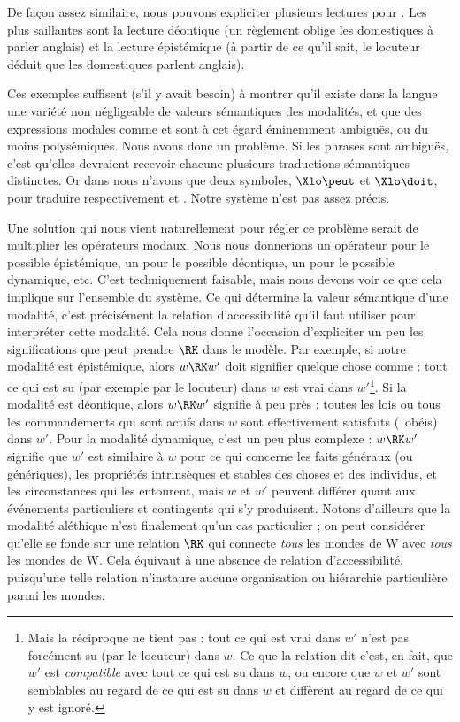 De façon assez similaire, nous pouvons expliciter plusieurs lectures pour \Last[b]. Les plus saillantes sont la lecture déontique (un règlement oblige les domestiques à parler anglais) et la lecture épistémique (à partir de ce qu'il sait, le locuteur déduit que les domestiques parlent anglais).

Ces exemples suffisent (s'il y avait besoin) à montrer qu'il existe dans la langue une variété non négligeable de valeurs sémantiques des modalités, et que des expressions modales comme  et  sont à cet égard éminemment ambiguës, ou du moins polysémiques.
Nous avons donc un problème. Si les phrases {\Last} sont ambiguës, c'est qu'elles devraient recevoir chacune plusieurs  traductions sémantiques distinctes. 
Or dans {\LO} nous n'avons que deux symboles, $\Xlo\peut$ et $\Xlo\doit$, pour traduire respectivement   et . 
Notre système n'est pas assez précis.

Une solution qui nous vient naturellement pour régler ce problème serait de multiplier les opérateurs modaux. Nous nous donnerions un opérateur pour le possible épistémique, un pour le possible déontique, un pour le possible dynamique, etc. C'est techniquement faisable, mais nous devons voir ce que cela implique sur l'ensemble du système. Ce qui détermine la valeur sémantique d'une modalité, c'est précisément la relation d'accessibilité qu'il faut utiliser pour interpréter cette modalité.  Cela nous donne l'occasion d'expliciter un peu les significations que peut prendre $\RK$ dans le modèle. 
Par exemple, si notre modalité est épistémique, alors $w\RK w'$ doit signifier quelque chose comme : tout ce qui est su (par exemple par le locuteur) dans $w$ est vrai dans $w'$\footnote{Mais la réciproque ne tient pas : tout ce qui est vrai dans $w'$ n'est pas forcément su (par le locuteur) dans $w$. Ce que la relation dit c'est, en fait, que $w'$ est \emph{compatible} avec tout ce qui est su dans $w$, ou encore que $w$ et $w'$ sont semblables au regard de ce qui est su dans $w$ et diffèrent au regard de ce qui y est ignoré.}.  Si la modalité est déontique, alors $w\RK w'$ signifie à peu près : toutes les lois ou tous les commandements qui sont actifs dans $w$ sont effectivement satisfaits (\ie\ obéis) dans $w'$. 
Pour la modalité dynamique, c'est un peu plus complexe : $w\RK w'$ signifie que
$w'$ est similaire à $w$ pour ce qui concerne les faits généraux (ou génériques), les propriétés intrinsèques et stables des choses et des individus, et les circonstances qui les entourent, mais $w$ et $w'$ peuvent différer quant aux événements particuliers et contingents qui s'y produisent.
Notons d'ailleurs que la modalité aléthique n'est finalement qu'un cas particulier ; on peut considérer qu'elle se fonde sur une relation $\RK$ qui connecte \emph{tous} les mondes de \Unv W avec \emph{tous} les mondes de \Unv W.  Cela équivaut à une absence de relation d'accessibilité, puisqu'une telle relation n'instaure aucune organisation ou hiérarchie particulière parmi les mondes.

